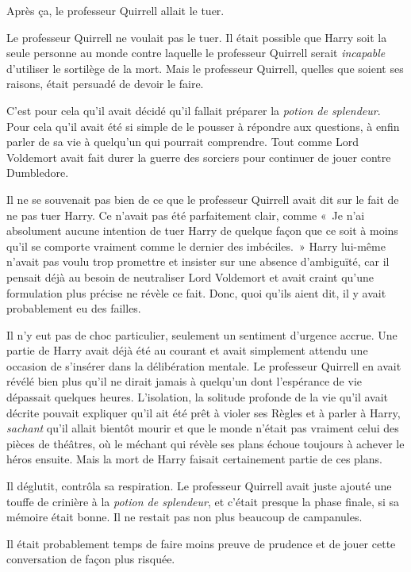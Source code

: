 Après ça, le professeur Quirrell allait le tuer.

Le professeur Quirrell ne voulait pas le tuer. Il était possible que Harry soit la seule personne au monde contre laquelle le professeur Quirrell serait \emph{incapable} d'utiliser le sortilège de la mort. Mais le professeur Quirrell, quelles que soient ses raisons, était persuadé de devoir le faire.

C'est pour cela qu'il avait décidé qu'il fallait préparer la \emph{potion de splendeur}. Pour cela qu'il avait été si simple de le pousser à répondre aux questions, à enfin parler de sa vie à quelqu'un qui pourrait comprendre. Tout comme Lord Voldemort avait fait durer la guerre des sorciers pour continuer de jouer contre Dumbledore.

Il ne se souvenait pas bien de ce que le professeur Quirrell avait dit sur le fait de ne pas tuer Harry. Ce n'avait pas été parfaitement clair, comme «~Je n'ai absolument aucune intention de tuer Harry de quelque façon que ce soit à moins qu'il se comporte vraiment comme le dernier des imbéciles.~» Harry lui-même n'avait pas voulu trop promettre et insister sur une absence d'ambiguïté, car il pensait déjà au besoin de neutraliser Lord Voldemort et avait craint qu'une formulation plus précise ne révèle ce fait. Donc, quoi qu'ils aient dit, il y avait probablement eu des failles.

Il n'y eut pas de choc particulier, seulement un sentiment d'urgence accrue. Une partie de Harry avait déjà été au courant et avait simplement attendu une occasion de s'insérer dans la délibération mentale. Le professeur Quirrell en avait révélé bien plus qu'il ne dirait jamais à quelqu'un dont l'espérance de vie dépassait quelques heures. L'isolation, la solitude profonde de la vie qu'il avait décrite pouvait expliquer qu'il ait été prêt à violer ses Règles et à parler à Harry, \emph{sachant} qu'il allait bientôt mourir et que le monde n'était pas vraiment celui des pièces de théâtres, où le méchant qui révèle ses plans échoue toujours à achever le héros ensuite. Mais la mort de Harry faisait certainement partie de ces plans.

Il déglutit, contrôla sa respiration. Le professeur Quirrell avait juste ajouté une touffe de crinière à la \emph{potion de splendeur}, et c'était presque la phase finale, si sa mémoire était bonne. Il ne restait pas non plus beaucoup de campanules.

Il était probablement temps de faire moins preuve de prudence et de jouer cette conversation de façon plus risquée.

